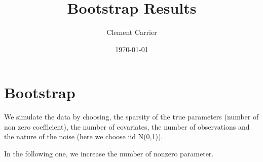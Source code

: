 \documentclass[11pt,oneside, a4paper]{amsart}\usepackage[]{graphicx}\usepackage[]{color}
\begin{document}
  
\title{Bootstrap Results}   
\author{Clement Carrier}
\date{\today}
\maketitle


\section*{Bootstrap}










We simulate the data by choosing, the sparsity of the true parameters (number of non zero coefficient), the number of covariates, the number of observations and the nature of the noise (here we choose iid N(0,1)). 







\begin{table}[ht]
\centering
\caption{Simulation Result} 
\label{Test_table}
{\footnotesize
{}
}
\end{table}



In the following one, we increase the number of nonzero parameter. 
\end{document}
